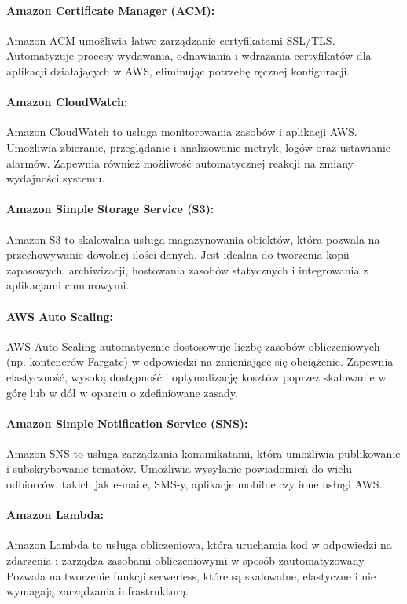 \documentclass[../../main.tex]{subfiles}
\begin{document}
        \paragraph{Amazon Certificate Manager (ACM):}
        Amazon ACM umożliwia łatwe zarządzanie certyfikatami SSL/TLS. Automatyzuje procesy wydawania, odnawiania i wdrażania certyfikatów dla aplikacji działających w AWS, eliminując potrzebę ręcznej konfiguracji.
        
        \paragraph{Amazon CloudWatch:}
        Amazon CloudWatch to usługa monitorowania zasobów i aplikacji AWS. Umożliwia zbieranie, przeglądanie i analizowanie metryk, logów oraz ustawianie alarmów. Zapewnia również możliwość automatycznej reakcji na zmiany wydajności systemu.
        
        \paragraph{Amazon Simple Storage Service (S3):}
        Amazon S3 to skalowalna usługa magazynowania obiektów, która pozwala na przechowywanie dowolnej ilości danych. Jest idealna do tworzenia kopii zapasowych, archiwizacji, hostowania zasobów statycznych i integrowania z aplikacjami chmurowymi.
        
        \paragraph{AWS Auto Scaling:}
        AWS Auto Scaling automatycznie dostosowuje liczbę zasobów obliczeniowych (np. kontenerów Fargate) w odpowiedzi na zmieniające się obciążenie. Zapewnia elastyczność, wysoką dostępność i optymalizację kosztów poprzez skalowanie w górę lub w dół w oparciu o zdefiniowane zasady.

        \paragraph{Amazon Simple Notification Service (SNS):}
        Amazon SNS to usługa zarządzania komunikatami, która umożliwia publikowanie i subskrybowanie tematów. Umożliwia wysyłanie powiadomień do wielu odbiorców, takich jak e-maile, SMS-y, aplikacje mobilne czy inne usługi AWS.

        \paragraph{Amazon Lambda:}
        Amazon Lambda to usługa obliczeniowa, która uruchamia kod w odpowiedzi na zdarzenia i zarządza zasobami obliczeniowymi w sposób zautomatyzowany. Pozwala na tworzenie funkcji serwerless, które są skalowalne, elastyczne i nie wymagają zarządzania infrastrukturą.
    
\end{document}

